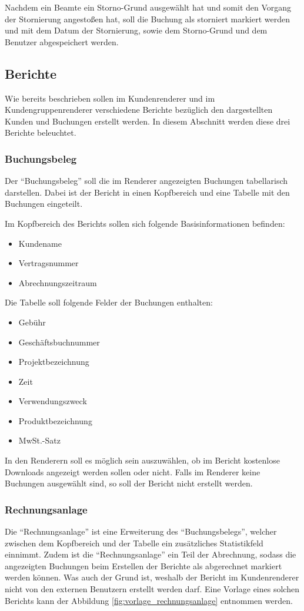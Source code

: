 Nachdem ein Beamte ein Storno-Grund ausgewählt hat und somit den Vorgang der Stornierung angestoßen hat, soll die Buchung als storniert markiert werden und mit dem Datum der Stornierung, sowie dem Storno-Grund und dem Benutzer abgespeichert werden.

\subsection{Berichte} \label{subsec:berichte}
Wie bereits beschrieben sollen im Kundenrenderer und im Kundengruppenrenderer verschiedene Berichte bezüglich den dargestellten Kunden und Buchungen erstellt werden. In diesem Abschnitt werden diese drei Berichte beleuchtet.

\subsubsection{Buchungsbeleg}
Der \enquote{Buchungsbeleg} soll die im Renderer angezeigten Buchungen tabellarisch darstellen.
Dabei ist der Bericht in einen Kopfbereich und eine Tabelle mit den Buchungen eingeteilt.

Im Kopfbereich des Berichts sollen sich folgende Basisinformationen befinden:
\begin{itemize}
  \item Kundename 
  \item Vertragsnummer
  \item Abrechnungszeitraum
\end{itemize}  
Die Tabelle soll folgende Felder der Buchungen enthalten:
\begin{itemize}
 \item Gebühr
 \item Geschäftsbuchnummer 
 \item Projektbezeichnung
 \item Zeit
 \item Verwendungszweck
 \item Produktbezeichnung
 \item MwSt.-Satz
\end{itemize}

In den Renderern soll es möglich sein auszuwählen, ob im Bericht kostenlose Downloads angezeigt werden sollen oder nicht.
Falls im Renderer keine Buchungen ausgewählt sind, so soll der Bericht nicht erstellt werden.

\subsubsection{Rechnungsanlage}
Die \enquote{Rechnungsanlage} ist eine Erweiterung des \enquote{Buchungsbelegs}, welcher zwischen dem Kopfbereich und der Tabelle ein zusätzliches Statistikfeld einnimmt.
Zudem ist die \enquote{Rechnungsanlage} ein Teil der Abrechnung, sodass die angezeigten Buchungen beim Erstellen der Berichte als abgerechnet markiert werden können.
Was auch der Grund ist, weshalb der Bericht im Kundenrenderer nicht von den externen Benutzern erstellt werden darf.
Eine Vorlage eines solchen Berichts kann der Abbildung \vref{fig:vorlage_rechnungsanlage} entnommen werden.

